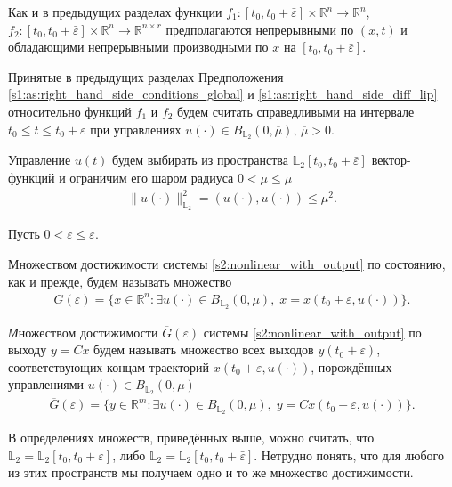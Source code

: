 \documentclass[../main.tex]{subfiles}
\begin{document}
Как и в предыдущих разделах функции $ f_1: [t_0, t_0 + \bar{\varepsilon}] \times \mathbb{R}^{n} \rightarrow \mathbb{R}^{n} $, $ f_2: [t_0, t_0 + \bar{\varepsilon}] \times \mathbb{R}^{n} \rightarrow \mathbb{R}^{n \times r} $ предполагаются непрерывными по $(x, t)$ и обладающими непрерывными производными по $x$ на $ [t_0, t_0 + \bar{\varepsilon}]$. 

Принятые в предыдущих разделах Предположения \ref{s1:as:right_hand_side_conditions_global} и \ref{s1:as:right_hand_side_diff_lip} относительно функций $f_1$ и $f_2$ будем считать справедливыми на интервале $t_0 \leqslant t \leqslant t_0 + \overline{\varepsilon} $ при управлениях $u(\cdot) \in B_{\mathbb{L}_2}(0, \overline{\mu}) $, $\overline{\mu} > 0$.

 Управление $u(t)$ будем выбирать из
пространства $\mathbb{L}_2[t_0,t_0+\bar{\varepsilon}]$ вектор-функций и ограничим его шаром радиуса $ 0 < \mu \leqslant \overline{\mu} $
\begin{gather}\label{constrY}
    \lVert u(\cdot)\rVert^2_{\mathbb{L}_2} = \left(u(\cdot),u(\cdot) \right) \leqslant \mu^2.
\end{gather}

Пусть $ 0 <  \varepsilon \leqslant \bar{\varepsilon} $. 

Множеством достижимости системы \eqref{s2:nonlinear_with_output} по состоянию, как и прежде, будем называть множество 
\begin{gather*}
    G(\varepsilon)=\{x\in \mathbb{R}^n:\exists u(\cdot)\in B_{\mathbb{L}_2}(0,\mu),\; x=x(t_0+\varepsilon, u(\cdot))\}.
\end{gather*}


\begin{definition}
    {\textit Множеством достижимости $\overline{G}(\varepsilon)$ системы \eqref{s2:nonlinear_with_output} по выходу} $ y = C x $ будем называть множество всех выходов $ y(t_0+\varepsilon) $,
    соответствующих концам траекторий $ x(t_0+\varepsilon, u(\cdot)) $, порождённых управлениями $ u(\cdot) \in B_{\mathbb{L}_2}(0,\mu)$
    \begin{gather*}
        \overline{G}(\varepsilon)=\{y\in \mathbb{R}^m:\exists u(\cdot)\in B_{\mathbb{L}_2}(0,\mu),\; y=Cx(t_0+\varepsilon, u(\cdot))\}.
    \end{gather*}
\end{definition}

В определениях множеств, приведённых выше, можно считать, что $ \mathbb{L}_2 =\mathbb{L}_2[t_0,t_0+\varepsilon] $, либо  $ \mathbb{L}_2=\mathbb{L}_2[t_0,t_0+\bar{\varepsilon}] $.
Нетрудно понять, что для любого из этих пространств мы получаем одно и то же множество достижимости. 
    
\end{document}
